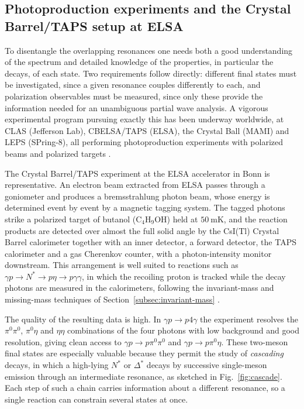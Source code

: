 \FloatBarrier

\subsection{Photoproduction experiments and the Crystal Barrel/TAPS setup at ELSA}
\label{subsec:photoproduction-elsa}

To disentangle the overlapping resonances one needs both a good understanding of the
spectrum and detailed knowledge of the properties, in particular the decays, of each
state. Two requirements follow directly: different final states must be investigated,
since a given resonance couples differently to each, and polarization observables must be
measured, since only these provide the information needed for an unambiguous partial wave
analysis. A vigorous experimental program pursuing exactly this has been underway
worldwide, at CLAS (Jefferson Lab), CBELSA/TAPS (ELSA), the Crystal Ball (MAMI) and LEPS
(SPring-8), all performing photoproduction experiments with polarized beams and polarized
targets \cite[Ch.~15]{Amsler2018}.

The Crystal Barrel/TAPS experiment at the ELSA accelerator in Bonn is representative. An
electron beam extracted from ELSA passes through a goniometer and produces a
bremsstrahlung photon beam, whose energy is determined event by event by a magnetic
tagging system. The tagged photons strike a polarized target of butanol
($\mathrm{C_4H_9OH}$) held at $50~\mathrm{mK}$, and the reaction products are detected over
almost the full solid angle by the CsI(Tl) Crystal Barrel calorimeter together with an
inner detector, a forward detector, the TAPS calorimeter and a gas Cherenkov counter, with
a photon-intensity monitor downstream. This arrangement is well suited to reactions such as
$\gamma p \to N^{*} \to p\eta \to p\gamma\gamma$, in which the recoiling proton is tracked
while the decay photons are measured in the calorimeters, following the invariant-mass and
missing-mass techniques of Section~\ref{subsec:invariant-mass} \cite[Ch.~2]{Amsler2018}.

The quality of the resulting data is high. In $\gamma p \to p4\gamma$ the experiment
resolves the $\pi^0\pi^0$, $\pi^0\eta$ and $\eta\eta$ combinations of the four photons with
low background and good resolution, giving clean access to $\gamma p \to p\pi^0\pi^0$ and
$\gamma p \to p\pi^0\eta$. These two-meson final states are especially valuable because
they permit the study of \emph{cascading} decays, in which a high-lying $N^{*}$ or
$\Delta^{*}$ decays by successive single-meson emission through an intermediate resonance,
as sketched in Fig.~\ref{fig:cascade}. Each step of such a chain carries information about
a different resonance, so a single reaction can constrain several states at once.

